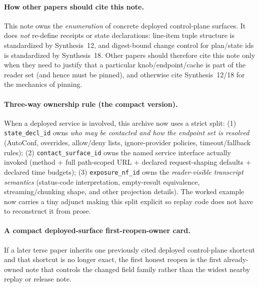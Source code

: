 \documentclass[11pt]{article}
\begin{document}
\paragraph{How other papers should cite this note.}
This note owns the \emph{enumeration} of concrete deployed control-plane surfaces.
It does \emph{not} re-define receipts or state declarations: line-item tuple structure is standardized by Synthesis~12, and digest-bound change control for plan/state ids is standardized by Synthesis~18.\cite{series:receiptitems,series:planstateequiv}
Other papers should therefore cite this note only when they need to justify that a particular knob/end\-point/cache is part of the reader set (and hence must be pinned), and otherwise cite Synthesis~12/18 for the mechanics of pinning.

\paragraph{Three-way ownership rule (the compact version).}
When a deployed service is involved, this archive now uses a strict split:
(1) \texttt{state\_decl\_id} owns \emph{who may be contacted and how the endpoint set is resolved} (AutoConf, overrides, allow/deny lists, ignore-provider policies, timeout/fallback rules);
(2) \texttt{contact\_surface\_id} owns the named service interface actually invoked (method + full path-scoped URL + declared request-shaping defaults + declared time budgets);
(3) \texttt{exposure\_nf\_id} owns the \emph{reader-visible transcript semantics} (status-code interpretation, empty-result equivalence, streaming/chunking shape, and other projection details).
The worked example now carries a tiny adjunct making this split explicit so replay code does not have to reconstruct it from prose.

\paragraph{A compact deployed-surface first-reopen-owner card.}
If a later terse paper inherits one previously cited deployed control-plane shortcut and that shortcut is no longer exact, the first honest reopen is the first already-owned note that controls the changed field family rather than the widest nearby replay or release note.
\end{document}
